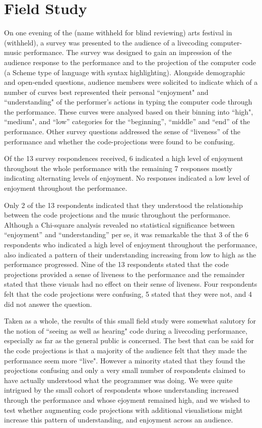\documentclass{sig-alternate}
\begin{document}

\section{Field Study}

On one evening of the (name withheld for blind reviewing) arts festival in (withheld), 
a survey was presented to the audience of a livecoding computer-music performance. The survey was designed to gain an impression of the audience response to the performance and to the projection of the computer code (a Scheme type of language with syntax highlighting). Alongside demographic and open-ended questions, audience members were solicited to indicate which of a number of curves best represented their personal ``enjoyment" and ``understanding" of the performer's actions in typing the computer code through the performance. These curves were analysed based on their binning into ``high", ``medium", and ``low'' categories for the ``beginning'', ``middle'' and ``end'' of the performance. Other survey questions addressed the sense of ``liveness'' of the performance and whether the code-projections were found to be confusing. 

Of the 13 survey respondences received, 6 indicated a high level of enjoyment throughout the whole performance with the remaining 7 responses mostly indicating alternating levels of enjoyment. No responses indicated a low level of enjoyment throughout the performance.

Only 2 of the 13 respondents indicated that they understood the relationship between the code projections and the music throughout the performance. Although a Chi-square analysis revealed no statistical significance between ``enjoyment'' and ``understanding'' per se, it was remarkable the that 3 of the 6 respondents who indicated a high level of enjoyment throughout the performance, also indicated a pattern of their understanding increasing from low to high as the performance progressed. Nine of the 13 respondents stated that the code projections provided a sense of liveness to the performance and the remainder stated that these visuals had no effect on their sense of liveness. Four respondents felt that the code projections were confusing, 5 stated that they were not, and 4 did not answer the question.

Taken as a whole, the results of this small field study were somewhat salutory for the notion of ``seeing as well as hearing" code during a livecoding performance, especially as far as the general public is concerned. The best that can be said for the code projections is that a majority of the audience felt that they made the performance seem more ``live". However a minority stated that they found the projections confusing and only a very small number of respondents claimed to have actually understood what the programmer was doing. We were quite intrigued by the small cohort of respondents whose understanding increased through the performance and whose ejoyment remained high, and we wished to test whether augmenting code projections with additional visualistions might increase this pattern of understanding, and enjoyment across an audience. 
\end{document}
